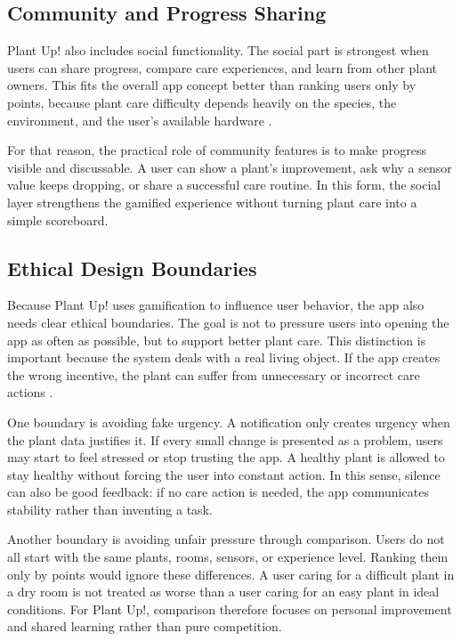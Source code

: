 \subsection{Community and Progress Sharing}

Plant Up! also includes social functionality. The social part is strongest when users can share progress, compare care experiences, and learn from other plant owners. This fits the overall app concept better than ranking users only by points, because plant care difficulty depends heavily on the species, the environment, and the user's available hardware \cite{chouGamification2015,plantUpProject}.

For that reason, the practical role of community features is to make progress visible and discussable. A user can show a plant's improvement, ask why a sensor value keeps dropping, or share a successful care routine. In this form, the social layer strengthens the gamified experience without turning plant care into a simple scoreboard.

\subsection{Ethical Design Boundaries}

Because Plant Up! uses gamification to influence user behavior, the app also needs clear ethical boundaries. The goal is not to pressure users into opening the app as often as possible, but to support better plant care. This distinction is important because the system deals with a real living object. If the app creates the wrong incentive, the plant can suffer from unnecessary or incorrect care actions \cite{gamifyMotivation,chouGamification2015}.

One boundary is avoiding fake urgency. A notification only creates urgency when the plant data justifies it. If every small change is presented as a problem, users may start to feel stressed or stop trusting the app. A healthy plant is allowed to stay healthy without forcing the user into constant action. In this sense, silence can also be good feedback: if no care action is needed, the app communicates stability rather than inventing a task.

Another boundary is avoiding unfair pressure through comparison. Users do not all start with the same plants, rooms, sensors, or experience level. Ranking them only by points would ignore these differences. A user caring for a difficult plant in a dry room is not treated as worse than a user caring for an easy plant in ideal conditions. For Plant Up!, comparison therefore focuses on personal improvement and shared learning rather than pure competition.

